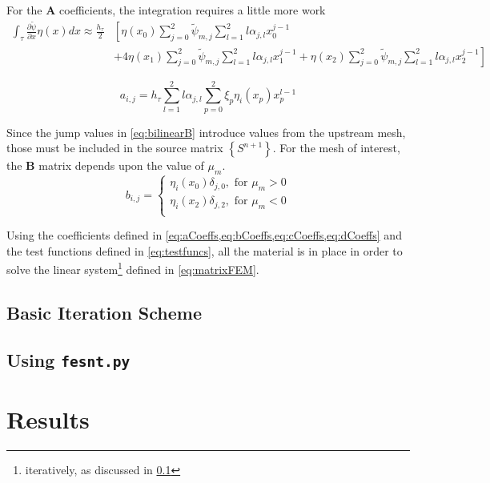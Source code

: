 \documentclass{article}
\newcommand{\pdiff}[2]{\frac{\partial#1}{\partial#2}}
\newcommand{\ddx}[1]{\pdiff{#1}{x}}
\newcommand{\fepsi}{\tilde{\psi}}
\newcommand{\fepsimj}{\fepsi_{m,j}}
\newcommand{\ajl}{\alpha_{j,l}}
\newcommand{\asMatrix}[1]{\mathbf{#1}}
\newcommand{\asVector}[1]{\left\lbrace#1\right\rbrace}
\begin{document}
For the $\asMatrix{A}$ coefficients, the integration requires a little more work
\begin{equation}
    \begin{split}
        \int_\tau\ddx{\fepsi}\eta(x)dx \approx \frac{h_\tau}{2}&\left[
            \eta(x_0)\sum_{j=0}^2\fepsimj\sum_{l=1}^2l\ajl x^{j-1}_0\right. \\
            & \left. +4\eta(x_1)\sum_{j=0}^2\fepsimj\sum_{l=1}^2l\ajl x^{j-1}_1
            +\eta(x_2)\sum_{j=0}^2\fepsimj\sum_{l=1}^2l\ajl x^{j-1}_2
        \right]
    \end{split}
\end{equation}

\begin{equation}
    \label{eq:aCoeffs}
    a_{i,j} = h_\tau\sum_{l=1}^2l\ajl\sum_{p=0}^2\xi_p\eta_i(x_p)x_p^{l-1}
\end{equation}

Since the jump values in \cref{eq:bilinearB} introduce values from the upstream mesh, 
those must be included in the source matrix $\asVector{S^{n+1}}$. 
For the mesh of interest, the $\asMatrix{B}$ matrix depends upon the value of $\mu_m$.
\begin{equation}
    \label{eq:bCoeffs}
    b_{i,j} = \begin{cases}
        \eta_i(x_0)\delta_{j,0},\text{ for }\mu_m > 0 \\
        \eta_i(x_2)\delta_{j,2},\text{ for }\mu_m < 0 \\
    \end{cases}
\end{equation}

Using the coefficients defined in \cref{eq:aCoeffs,eq:bCoeffs,eq:cCoeffs,eq:dCoeffs} and 
the test functions defined in \cref{eq:testfuncs}, all the material is in place in order
to solve the linear system\footnote{iteratively, as discussed in \cref{sec:iterations}}
defined in \cref{eq:matrixFEM}.
\subsection{Basic Iteration Scheme} \label{sec:iterations}

\subsection{Using \texttt{fesnt.py}} \label{sec:usage}

\section{Results} \label{sec:results}
\end{document}
